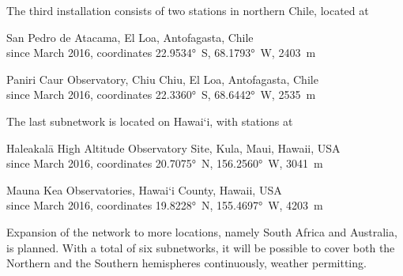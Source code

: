             The third installation consists of two stations in northern Chile, located at
            \begin{description}[leftmargin = 25mm]
                \item[SP]       San Pedro de Atacama, El Loa, Antofagasta, Chile\\
                                since March 2016, coordinates \ang{22.9534}~S, \ang{68.1793}~W, \SI{2403}{\metre}
                \item[PC]       Paniri Caur Observatory, Chiu Chiu, El Loa, Antofagasta, Chile\\
                                since March 2016, coordinates \ang{22.3360}~S, \ang{68.6442}~W, \SI{2535}{\metre}
            \end{description}

            The last subnetwork is located on Hawai`i, with stations at
            \begin{description}[leftmargin = 25mm]
                \item[HK]       Haleakalā High Altitude Observatory Site, Kula, Maui, Hawaii, USA\\
                                since March 2016, coordinates \ang{20.7075}~N, \ang{156.2560}~W, \SI{3041}{\metre} 
                \item[MK]       Mauna Kea Observatories, Hawai`i County, Hawaii, USA\\
                                since March 2016, coordinates \ang{19.8228}~N, \ang{155.4697}~W, \SI{4203}{\metre} 
            \end{description}


            Expansion of the network to more locations, namely South Africa and Australia, is planned.
            With a total of six subnetworks, it will be possible to cover both the Northern and
            the Southern hemispheres continuously, weather permitting.
